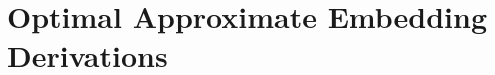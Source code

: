 \documentclass[twoside]{article} \usepackage{aistats2017}
\newcommand{\rv}[1]{\underline{#1}}
\begin{document}
%	
%		
%	
%		
%		
%		
%	
	
\section{Optimal Approximate Embedding Derivations}
\end{document}
